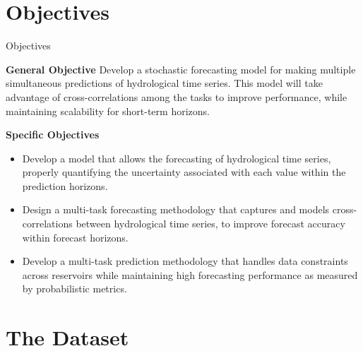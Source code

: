 \section{Objectives}

\begin{frame}{Objectives}
	\begin{block}{\textbf{General Objective}}
			Develop a stochastic forecasting model for making multiple simultaneous predictions of hydrological time series. This model will take advantage of cross-correlations among the tasks to improve performance, while maintaining scalability for short-term horizons.
	\end{block}
	
	\begin{block}{\textbf{Specific Objectives}}
			\begin{itemize}
			\item Develop a model that allows the forecasting of hydrological time series, properly quantifying the uncertainty associated with each value within the prediction horizons.
			\item  Design a multi-task forecasting methodology that captures and models cross-correlations between hydrological time series, to improve forecast accuracy within forecast horizons.
			\item Develop a multi-task prediction methodology that handles data constraints across reservoirs while maintaining high forecasting performance as measured by probabilistic metrics.
		\end{itemize}
	\end{block}
\end{frame}

\section{The Dataset}

